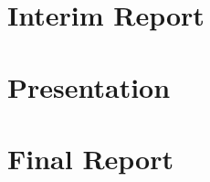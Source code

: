 \documentclass[12pt]{article}
\begin{document}
\section{Interim Report}

\section{Presentation}

\section{Final Report}
\end{document}
